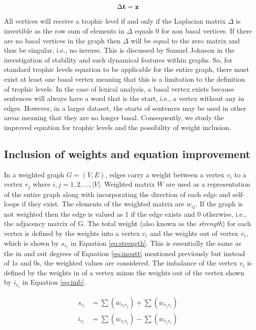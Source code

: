 \begin{equation} \label{eq:mtl}
\Delta\bold{t} = \bold{z} 
\end{equation}

All vertices will receive a trophic level if and only if the Laplacian matrix $\Delta$ is invertible as the row sum of elements in $\Delta$ equals 0 for non basal vertices. If there are no basal vertices in the graph then $\Delta$ will be equal to the zero matrix and thus be singular, i.e., no inverse. This is discussed by Samuel Johnson \cite{johnson2020digraphs} in the investigation of stability and such dynamical features within graphs. So, for standard trophic levels equation to be applicable for the entire graph, there must exist at least one basal vertex meaning that this is a limitation to the definition of trophic levels. In the case of lexical analysis, a basal vertex exists because sentences will always have a word that is the start, i.e., a vertex without any in edges. However, in a larger dataset, the starts of sentences may be used in other areas meaning that they are no longer basal. Consequently, we study the improved equation for trophic levels and the possibility of weight inclusion. 

\subsection{Inclusion of weights and equation improvement}
In a weighted graph $G = (V, E)$, edges carry a weight between a vertex $v_i$ to a vertex $v_j$ where $i , j = 1 , 2, \dots , \lvert V \rvert$. Weighted matrix $W$ are used as a representation of the entire graph along with incorporating the direction of each edge and self-loops if they exist. The elements of the weighted matrix are $w_{ij}$. If the graph is not weighted then the edge is valued as 1 if the edge exists and 0 otherwise, i.e., the adjacency matrix of G. The total weight (also known as the \emph{strength}) for each vertex is defined by the weights into a vertex $v_i$ and the weights out of vertex $v_i$, which is shown by $s_{v_i}$ in Equation \ref{eq:strength}. This is essentially the same as the in and out degrees of Equation \ref{eq:inoutt} mentioned previously but instead of 1s and 0s, the weighted values are considered. The imbalance of the vertex $v_i$ is defined by the weights in of a vertex minus the weights out of the vertex shown by $i_{v_i}$ in Equation \ref{eq:imb}.

\begin{align}
s_{v_i} &= \sum(w_{v_iv_j}) + \sum(w_{v_jv_i}) \label{eq:strength} \\
i_{v_i} &= \sum(w_{v_iv_j}) - \sum(w_{v_jv_i}) \label{eq:imb}
\end{align}

